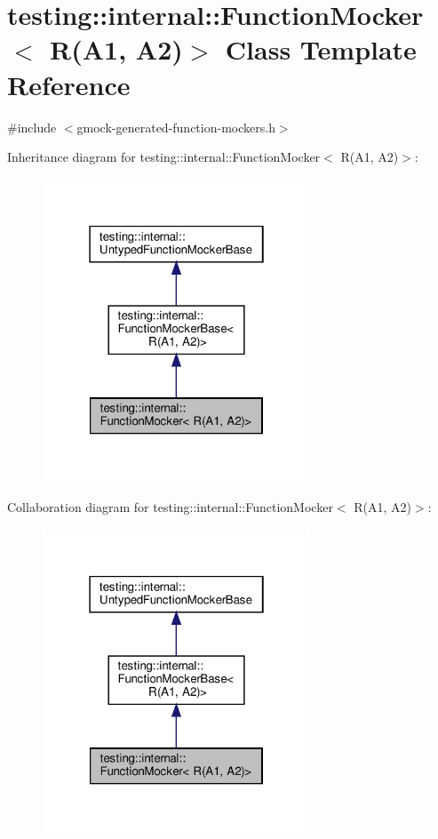 \hypertarget{classtesting_1_1internal_1_1_function_mocker_3_01_r_07_a1_00_01_a2_08_4}{}\section{testing\+:\+:internal\+:\+:Function\+Mocker$<$ R(A1, A2)$>$ Class Template Reference}
\label{classtesting_1_1internal_1_1_function_mocker_3_01_r_07_a1_00_01_a2_08_4}


{\ttfamily \#include $<$gmock-\/generated-\/function-\/mockers.\+h$>$}



Inheritance diagram for testing\+:\+:internal\+:\+:Function\+Mocker$<$ R(A1, A2)$>$\+:
\nopagebreak
\begin{figure}[H]
\begin{center}
\leavevmode
\includegraphics[width=226pt]{classtesting_1_1internal_1_1_function_mocker_3_01_r_07_a1_00_01_a2_08_4__inherit__graph}
\end{center}
\end{figure}


Collaboration diagram for testing\+:\+:internal\+:\+:Function\+Mocker$<$ R(A1, A2)$>$\+:
\nopagebreak
\begin{figure}[H]
\begin{center}
\leavevmode
\includegraphics[width=226pt]{classtesting_1_1internal_1_1_function_mocker_3_01_r_07_a1_00_01_a2_08_4__coll__graph}
\end{center}
\end{figure}
